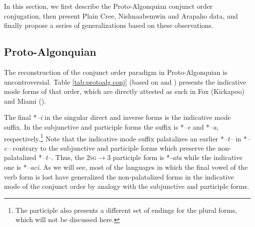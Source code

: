 \documentclass[twoside,a4paper,11pt]{article}
\newcommand{\ipa}[1]{{\phon\textit{#1}}}
\newcommand{\Σ}{\greek{Σ}}
\begin{document}
In this section, we first describe the Proto-Algonquian conjunct order conjugation, then present Plain Cree, Nishnaabemwin and Arapaho data, and finally propose a series of generalizations based on these observations.

\subsection{Proto-Algonquian}
The reconstruction of the conjunct order paradigm in Proto-Algonquian is uncontroversial. Table \ref{tab:protoalg.conj} (based on \citealt{bloomfield46proto} and \citealt{goddard00cheyenne}) presents the indicative mode forms of that order, which are directly attested as such in Fox (Kickapoo) and Miami (\citealt{costa03miami}).

The final *\ipa{--i} in the singular direct and inverse forms is the indicative mode suffix. In the subjunctive and participle forms the suffix is *\ipa{--e} and *\ipa{--a}, respectively.\footnote{The participle also presents a different set of endings for the plural forms, which will not be discussed here.} Note that the indicative mode suffix palatalizes an earlier *\ipa{--t--} in *\ipa{--c--} contrary to the subjunctive and participle forms which preserve the non-palatalized *\ipa{--t--}. Thus, the \textsc{2sg$\rightarrow$3} participle form is *\ipa{-ata} while the indicative one is *\ipa{--aci}. As we will see, most of the languages in which the final vowel of the verb form is lost have generalized the non-palatalized forms in the indicative mode of the conjunct order by analogy with the subjunctive and participle forms.
\end{document}
